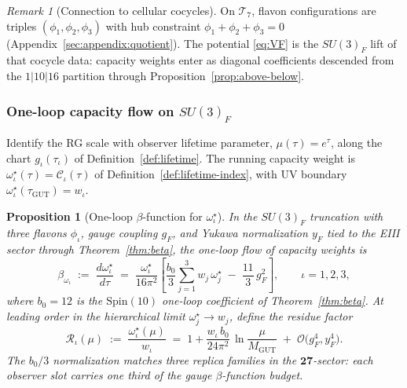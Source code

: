 \documentclass[11pt]{article}
\theoremstyle{plain}
\newtheorem{proposition}[theorem]{Proposition}
\theoremstyle{definition}
\theoremstyle{remark}
\newtheorem{remark}[theorem]{Remark}
\numberwithin{equation}{section}
\newcommand{\Spin}{\mathrm{Spin}}
\newcommand{\capacity}{\mathcal{C}}
\begin{document}
\begin{remark}[Connection to cellular cocycles]
On $\mathcal{T}_7$, flavon configurations are triples
$(\phi_1,\phi_2,\phi_3)$ with hub constraint $\phi_1+\phi_2+\phi_3=0$
(Appendix~\ref{sec:appendix:quotient}). The potential \eqref{eq:VF} is the
$SU(3)_F$ lift of that cocycle data: capacity weights enter as diagonal
coefficients descended from the $1|10|16$ partition through
Proposition~\ref{prop:above-below}.
\end{remark}

\subsubsection{One-loop capacity flow on \texorpdfstring{$SU(3)_F$}{SU(3)F}}

Identify the RG scale with observer lifetime parameter,
$\mu(\tau)=e^\tau$, along the chart $g_\iota(\tau_\iota)$ of
Definition~\ref{def:lifetime}. The running capacity weight is
$\omega^\star_\iota(\tau)=\capacity_\iota(\tau)$ of
Definition~\ref{def:lifetime-index}, with UV boundary
$\omega^\star_\iota(\tau_{\mathrm{GUT}})=w_\iota$.

\begin{proposition}[One-loop $\beta$-function for $\omega^\star_\iota$]
\label{prop:flavon-beta}
In the $SU(3)_F$ truncation with three flavons $\phi_\iota$, gauge coupling
$g_F$, and Yukawa normalization $y_F$ tied to the EIII sector through
Theorem~\ref{thm:beta}, the one-loop flow of capacity weights is
\begin{equation}\label{eq:flavon-beta}
  \beta_{\omega_\iota}
  \;:=\;
  \frac{d\omega^\star_\iota}{d\tau}
  \;=\;
  \frac{\omega^\star_\iota}{16\pi^2}
  \left[
    \frac{b_0}{3}\sum_{j=1}^3 w_j\,\omega^\star_j
    \;-\;
    \frac{11}{3}\,g_F^2
  \right],
  \qquad \iota=1,2,3,
\end{equation}
where $b_0=12$ is the $\Spin(10)$ one-loop coefficient of
Theorem~\ref{thm:beta}. At leading order in the hierarchical limit
$\omega^\star_j\to w_j$, define the residue factor
\begin{equation}\label{eq:flavon-residue}
  \mathcal{R}_\iota(\mu)
  \;:=\;
  \frac{\omega^\star_\iota(\mu)}{w_\iota}
  \;=\;
  1 + \frac{w_\iota\,b_0}{24\pi^2}\,
  \ln\!\frac{\mu}{M_{\mathrm{GUT}}}
  \;+\;
  \mathcal{O}\!\bigl(g_F^4,y_F^4\bigr).
\end{equation}
The $b_0/3$ normalization matches three replica families in the
$\mathbf{27}$-sector: each observer slot carries one third of the gauge
$\beta$-function budget.
\end{proposition}
\end{document}
